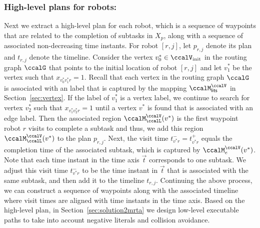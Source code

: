 \documentclass[Afour,sageh,times]{sagej}
\begin{document}
{{  \subsubsection{High-level plans for robots:} Next we extract a high-level plan for each robot, which is a sequence of waypoints that are related  to  the completion of subtasks in $X_p$, along with a sequence of associated non-decreasing time instants. For robot $[r,j]$, let $p_{r,j}$ denote its plan and $t_{r,j}$ denote the  timeline. Consider the vertex $v^*_0 \in \ccalV_{\text{init}}$ in the routing graph $\ccalG$ that points to the initial location of  robot $[r,j]$  and let $v^*_1$ be the vertex such that $x_{v^*_0 v^*_1 r} =1$. Recall that each vertex in the routing graph $\ccalG$ is associated with an label that is captured by the mapping $\ccalM_{\mathsf{lits}}^{\ccalV}$ in Section~\ref{sec:vertex}. If the label of $v_1^*$ is a vertex label, we continue to search for vertex $v_2^*$ such that $x_{v_1^* v_2^* r}=1$ until a vertex $v^*$ is found that is associated with an edge label. Then the associated region  $\ccalM^\ccalV_{\ccalL}(v^*)$ is the first waypoint robot $r$ visits to complete a subtask and thus, we add this region $\ccalM^\ccalV_{\ccalL}(v^*)$ to the plan $p_{r,j}$. Next, the visit time  $t^-_{v^* r} = t^+_{v^* r}$ equals the completion time of the associated subtask, which is captured by $\ccalM_{e}^{\ccalV}(v^*)$. Note that each time instant in the time axis $\vec{t}$ corresponds to one subtask.  We adjust this visit time $t^-_{v^* r}$ to be the time instant in $\vec{t}$ that is associated with the same subtask, and then add it to the timeline $t_{r,j}$.   Continuing the above process, we can construct a sequence of waypoints along with the associated timeline where visit times are aligned with time instants in the time axis. Based on the high-level plan, in Section~\ref{sec:solution2mrta} we design low-level executable paths to take into account negative literals and collision avoidance.

}}
\end{document}

